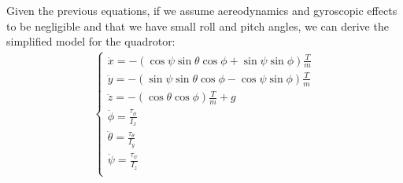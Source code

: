 Given the previous equations, if we assume aereodynamics and gyroscopic effects to be negligible and that we have small roll and pitch angles, we can derive the simplified model for the quadrotor:
\begin{align}
    \label{eq:uav_second_order}
    \begin{cases}
        \ddot{x} = -(\cos\psi \sin\theta \cos\phi + \sin\psi \sin\phi) \frac{T}{m}\\
        \ddot{y} = -(\sin\psi \sin\theta \cos\phi - \cos\psi \sin\phi) \frac{T}{m} \\
        \ddot{z} = -(\cos\theta \cos\phi) \frac{T}{m} +g\\
        \ddot{\phi} = \frac{\tau_{\phi}}{I_{x}}\\
        \ddot{\theta} = \frac{\tau_{\theta}}{I_{y}}\\
        \ddot{\psi} = \frac{\tau_{\psi}}{I_{z}}\\ 
    \end{cases}  
\end{align}
